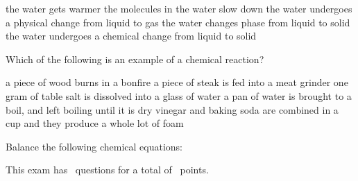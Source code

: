 \documentclass[11pt,addpoints]{exam}   	%
\begin{document}
\begin{questions}
\begin{choices}
\choice the water gets warmer
\choice the molecules in the water slow down
\choice the water undergoes a physical change from liquid to gas
\choice the water changes phase from liquid to solid
\choice the water undergoes a chemical change from liquid to solid
\end{choices}

\question[5]
Which of the following is an example of a chemical reaction?

\begin{choices}
\choice a piece of wood burns in a bonfire
\choice a piece of steak is fed into a meat grinder
\choice one gram of table salt is dissolved into a glass of water
\choice a pan of water is brought to a boil, and left boiling until it is dry
\choice vinegar and baking soda are combined in a cup and they produce a whole lot of foam
\end{choices}

\question
Balance the following chemical equations:


\end{questions}

\begin{center}
This exam has \numquestions\ questions for a total of \numpoints\ points.
\end{center}
\end{document}
